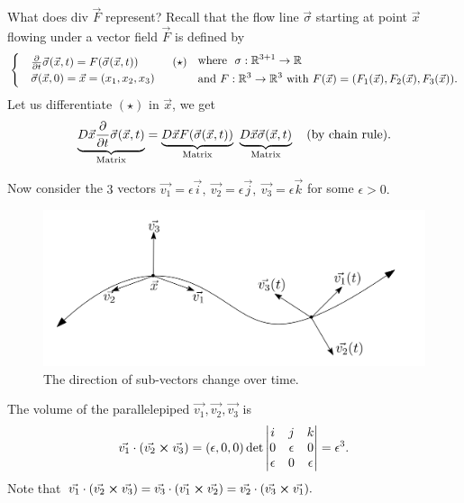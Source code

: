 \documentclass[
	12pt,
	]{article}
\newcommand{\R}{\mathbb{R}}
\theoremstyle{custom}
\theoremstyle{custom}
\theoremstyle{custom}
\theoremstyle{custom}
\theoremstyle{custom}
\theoremstyle{definition}
\theoremstyle{example}
\theoremstyle{note}
\theoremstyle{remark}
\theoremstyle{example}
\numberwithin{equation}{subsection}
\begin{document}
  				\noindent What does div $\vec{F}$ represent? Recall that the flow line $\vec{\sigma}$ starting at point $\vec{x}$ flowing under a vector field $\vec{F}$ is defined by 
  				\begin{equation*}
  					\begin{cases}
  						&\pdv{}{t} \vec{\sigma}(\vec{x},t) = F (\vec{\sigma}(\vec{x},t)) \qquad\quad (\star) \\
  						&\vec{\sigma}(\vec{x},0) =\vec{x}= (x_{1},x_{2},x_{3})
  					\end{cases} \ \ 
  					\begin{align*}
  						&\text{where } \ \sigma : \R^{3+1} \to \R \\
  						&\text{and} \ F:\R^{3} \to \R^{3} \ \text{with } F(\vec{x}) = (F_{1}(\vec{x}) , F_{2}(\vec{x}), F_{3} (\vec{x})).
  					\end{align*}
  				\end{equation*}
  				\noindent Let us differentiate $(\star)$ in $\vec{x}$, we get 
  				$$ \underbrace{D\vec{x} \pdv{}{t}\vec{\sigma}(\vec{x},t)}_{\text{Matrix}} = \underbrace{D\vec{x}F(\vec{\sigma}(\vec{x},t))}_{\text{Matrix}} \ \underbrace{D\vec{x}\vec{\sigma}(\vec{x},t)}_{\text{Matrix}} \quad \text{(by chain rule)}.$$
  				
  				\noindent Now consider the $3$ vectors $\vec{v_{1}} = \epsilon \vec{i} , \ \vec{v_{2}} = \epsilon \vec{j} , \ \vec{v_{3}}=\epsilon \vec{k}$ for some $\epsilon > 0.$
  				\begin{figure}[H]
  					\centering
  					\includegraphics[width = 0.7\linewidth]{MATH314_Notes_Fig6.png}
  					\captionsetup{margin=1cm, justification=raggedright}\caption{The direction of sub-vectors change over time.}
  				\end{figure}
  				
  				\noindent The volume of the parallelepiped $\vec{v_{1}}, \vec{v_{2}}, \vec{v_{3}}$ is 
  				$$ \vec{v_{1}}\cdot (\vec{v_{2}} \cross \vec{v_{3}}) = (\epsilon, 0,0) \det 
  				\begin{vmatrix}
  					i & j& k \\
  					0 & \epsilon & 0 \\
  					\epsilon & 0 & \epsilon
  				\end{vmatrix} = \epsilon^{3}.$$
  				Note that $\vec{v_{1}}\cdot (\vec{v_{2}} \cross \vec{v_{3}}) = \vec{v_{3}} \cdot (\vec{v_{1}}\cross \vec{v_{2}})= \vec{v_{2}}\cdot (\vec{v_{3}}\cross \vec{v_{1}}).$
  				
\end{document}
